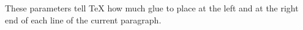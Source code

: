 \setlength\leftskip{4em}
\setlength\rightskip{1em}
These parameters tell \TeX{} how much glue
to place at the left and at the right end
of each line of the current paragraph.
